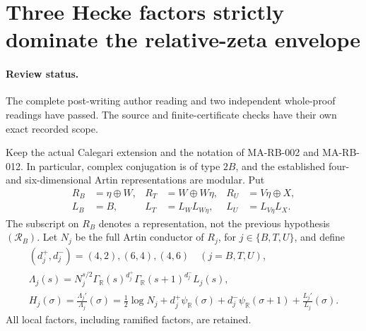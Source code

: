 \section{Three Hecke factors strictly dominate the relative-zeta envelope}
\label{sec:s5-hecke-variational}

\paragraph{Review status.}
The complete post-writing author reading and two independent
whole-proof readings have passed. The source and finite-certificate
checks have their own exact recorded scope.

Keep the actual Calegari extension and the notation of MA-RB-002
and MA-RB-012. In particular, complex conjugation is of type
\(2B\), and the established four- and six-dimensional Artin
representations are modular. Put
\[
 \begin{aligned}
  R_B&=\eta\oplus W,&
  R_T&=W\oplus W\eta,&
  R_U&=V\eta\oplus X,\\
  L_B&=B,& L_T&=L_WL_{W\eta},& L_U&=L_{V\eta}L_X.
 \end{aligned}
 \tag{MA-RB.200}
\]
The subscript on \(R_B\) denotes a representation, not the
previous hypothesis \((\mathcal R_B)\).
Let \(N_j\) be the full Artin conductor of \(R_j\), for
\(j\in\{B,T,U\}\), and define
\[
 \begin{gathered}
 (d_j^+,d_j^-)=(4,2),(6,4),(4,6)
                         \quad(j=B,T,U),\\
 \Lambda_j(s)=N_j^{s/2}\Gamma_{\mathbb R}(s)^{d_j^+}
                \Gamma_{\mathbb R}(s+1)^{d_j^-}L_j(s),\\
 H_j(\sigma)=\frac{\Lambda_j'}{\Lambda_j}(\sigma)
   =\frac12\log N_j+d_j^+\psi_{\mathbb R}(\sigma)
       +d_j^-\psi_{\mathbb R}(\sigma+1)
       +\frac{L_j'}{L_j}(\sigma).
 \end{gathered}
 \tag{MA-RB.201}
\]
All local factors, including ramified factors, are retained.

